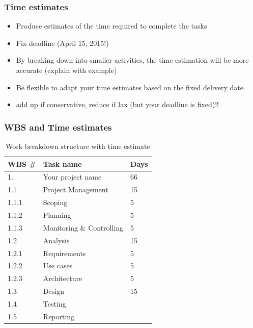 \begin{frame}[t]\frametitle{Time estimates}
    \begin{itemize}
        \item Produce estimates of the time required to complete the tasks
        \item Fix deadline (April 15, 2015!)
        \item By breaking down into smaller activities, the time estimation will be more accurate (explain with example)
        \item Be flexible to adapt your time estimates based on the fixed delivery date.
        \item add up if conservative, reduce if lax (but your deadline is fixed)!!
    \end{itemize}
\end{frame}


\begin{frame}[t]\frametitle{WBS and Time estimates}
\begin{table}[htb!]
    \caption{Work breakdown structure with time estimate}
    \label{tab:wbs}
    \begin{center}
        \begin{tabular}{p{2cm}|l|l}
        \textbf{WBS \#} & \textbf{Task name} & \textbf{Days} \\
        \hline

        \hline
        1. & Your project name & 66\\
        \hline

        \hline
        1.1 & Project Management & 15 \\
        1.1.1 & Scoping & 5\\
        1.1.2 & Planning & 5\\
        1.1.3 & Monitoring \& Controlling & 5\\
        \hline
        1.2 & Analysis & 15 \\
        1.2.1 & Requirements & 5 \\
        1.2.2 & Use cases & 5 \\
        1.2.3 & Architecture & 5 \\
        \hline
        1.3 & Design & 15\\
        \hline
        1.4 & Testing & \\
        \hline
        1.5 & Reporting & \\
        \hline

        \hline
        \end{tabular}
    \end{center}
\end{table}
\end{frame}




